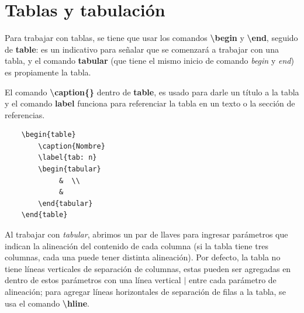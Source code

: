 \section{Tablas y tabulación}

Para trabajar con tablas, se tiene que usar los comandos \textbf{\textbackslash{begin}} y \textbf{\textbackslash{end}}, seguido de \textbf{table}: es un indicativo para señalar que se comenzará a trabajar con una tabla, y el comando \textbf{tabular} (que tiene el mismo inicio de comando \textit{begin} y \textit{end}) es propiamente la tabla.

El comando \textbf{\textbackslash{caption\{\}}} dentro de \textbf{table}, es usado para darle un título a la tabla y el comando \textbf{label} funciona para referenciar la tabla en un texto o la sección de referencias.
\begin{lstlisting}
    \begin{table}
        \caption{Nombre}
        \label{tab: n}
        \begin{tabular}
             &  \\
             & 
        \end{tabular}
    \end{table}
\end{lstlisting}

Al trabajar con \textit{tabular}, abrimos un par de llaves para ingresar parámetros que indican la alineación del contenido de cada columna (si la tabla tiene tres columnas, cada una puede tener distinta alineación). Por defecto, la tabla no tiene líneas verticales de separación de columnas, estas pueden ser agregadas en dentro de estos parámetros con una línea vertical \textbf{\(|\)} entre cada parámetro de alineación; para agregar líneas horizontales de separación de filas a la tabla, se usa el comando \textbf{\textbackslash{hline}}.

